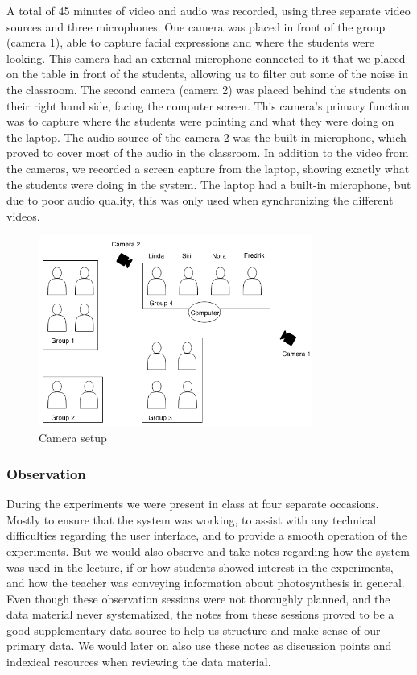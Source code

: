 A total of 45 minutes of video and audio was recorded, using three separate video sources and three microphones. One camera was placed in front of the group (camera 1), able to capture facial expressions and where the students were looking. This camera had an external microphone connected to it that we placed on the table in front of the students, allowing us to filter out some of the noise in the classroom. The second camera (camera 2) was placed behind the students on their right hand side, facing the computer screen. This camera's primary function was to capture where the students were pointing and what they were doing on the laptop. The audio source of the camera 2 was the built-in microphone, which proved to cover most of the audio in the classroom. In addition to the video from the cameras, we recorded a screen capture from the laptop, showing exactly what the students were doing in the system. The laptop had a built-in microphone, but due to poor audio quality, this was only used when synchronizing the different videos.
\begin{figure}
\centering
\includegraphics[width=0.8\textwidth]{img/empiricalsetting/class_diagram.png}
\caption{Camera setup}
\label{fig:camerasetup}
\end{figure}

\subsubsection{Observation}
During the experiments we were present in class at four separate occasions. Mostly to ensure that the system was working, to assist with any technical difficulties regarding the user interface, and to provide a smooth operation of the experiments. But we would also observe and take notes regarding how the system was used in the lecture, if or how students showed interest in the experiments, and how the teacher was conveying information about photosynthesis in general. Even though these observation sessions were not thoroughly planned, and the data material never systematized, the notes from these sessions proved to be a good supplementary data source to help us structure and make sense of our primary data. We would later on also use these notes as discussion points and indexical resources when reviewing the data material. 

